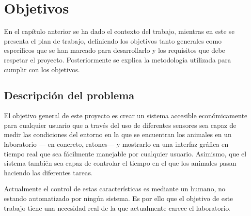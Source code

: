 \chapter{Objetivos}
\label{cap:capitulo2}



\vspace{1cm}

En el capítulo anterior se ha dado el contexto del trabajo, mientras en este se presenta el plan de trabajo, definiendo los objetivos tanto generales como específicos que se han marcado para desarrollarlo y los requisitos que debe respetar el proyecto. Posteriormente se explica la metodología utilizada para cumplir con los objetivos.\\

\section{Descripción del problema}
\label{sec:descripcion}

El objetivo general de este proyecto es crear un sistema accesible económicamente para cualquier usuario que a través del uso de diferentes sensores sea capaz de medir las condiciones del entorno en la que se encuentran los animales en un laboratorio --- en concreto, ratones--- y mostrarlo en una interfaz gráfica en tiempo real que sea fácilmente manejable por cualquier usuario. Asimismo, que el sistema también sea capaz de controlar el tiempo en el que los animales pasan haciendo las diferentes tareas.

Actualmente el control de estas características es mediante un humano, no estando automatizado por ningún sistema. Es por ello que el objetivo de este trabajo tiene una necesidad real de la que actualmente carece el laboratorio.

